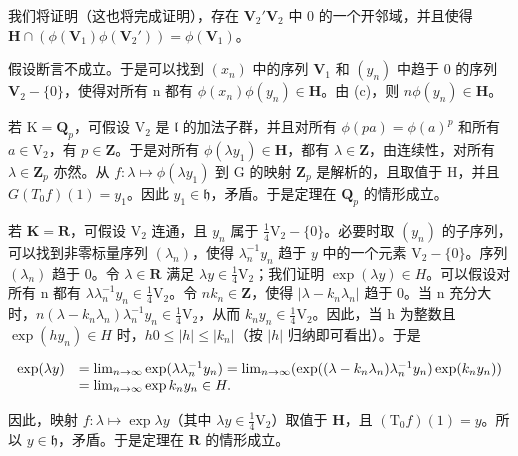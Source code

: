 我们将证明（这也将完成证明），存在 \(\mathbf{V}_2'\)\(\mathbf{V}_2\) 中 0 的一个开邻域，并且使得 \(\mathbf{H} \cap (\phi(\mathbf{V}_1)\phi(\mathbf{V}_2')) = \phi(\mathbf{V}_1)\)。

假设断言不成立。于是可以找到 \((x_{n})\) 中的序列 \(\mathbf{V}_1\) 和 \((y_{n})\) 中趋于 0 的序列 \(\mathbf{V}_2 - \{0\}\)，使得对所有 n 都有 \(\phi (x_n)\phi (y_n)\in \mathbf{H}\)。由 (c)，则 \(n\)\(\phi (y_n)\in \mathbf{H}\)。

若 \(\mathrm{K} = \mathbf{Q}_p\)，可假设 \(\mathrm{V}_2\) 是 \(\mathfrak{l}\) 的加法子群，并且对所有 \(\phi (pa) = \phi (a)^p\) 和所有 \(a\in \mathrm{V}_2\)，有 \(p\in \mathbf{Z}\)。于是对所有 \(\phi (\lambda y_1)\in \mathbf{H}\)，都有 \(\lambda \in \mathbf{Z}\)，由连续性，对所有 \(\lambda \in \mathbf{Z}_p\) 亦然。从 \(f\colon \lambda \mapsto \phi (\lambda y_1)\) 到 G 的映射 \(\mathbf{Z}_p\) 是解析的，且取值于 H，并且 \(G\)\((T_0f)(1) = y_1\)。因此 \(y_{1}\in \mathfrak{h}\)，矛盾。于是定理在 \(\mathbf{Q}_p\) 的情形成立。

若 \(\mathbf{K} = \mathbf{R}\)，可假设 \(\mathrm{V}_2\) 连通，且 \(y_{n}\) 属于 \(\frac{1}{4}\mathrm{V}_2 - \{0\}\)。必要时取 \((y_n)\) 的子序列，可以找到非零标量序列 \((\lambda_n)\)，使得 \(\lambda_n^{-1}y_n\) 趋于 \(y\) 中的一个元素 \(\mathrm{V}_2 - \{0\}\)。序列 \((\lambda_n)\) 趋于 0。令 \(\lambda \in \mathbf{R}\) 满足 \(\lambda y \in \frac{1}{4}\mathrm{V}_2\)；我们证明 \(\exp (\lambda y) \in H\)。可以假设对所有 n 都有 \(\lambda\lambda_n^{-1}y_n \in \frac{1}{4}\mathrm{V}_2\)。令 \(n\)\(k_n \in \mathbf{Z}\)，使得 \(|\lambda - k_n\lambda_n|\) 趋于 0。当 n 充分大时，\(n\)\((\lambda - k_n\lambda_n)\lambda_n^{-1}y_n \in \frac{1}{4}\mathrm{V}_2\)，从而 \(k_n y_n \in \frac{1}{4}\mathrm{V}_2\)。因此，当 h 为整数且 \(\exp (hy_n) \in H\) 时，\(h\)\(0 \leqslant |h| \leqslant |k_n|\)（按 \(|h|\) 归纳即可看出）。于是

\[
\begin{array}{r l} \exp (\lambda y) & = \lim _ {n \to \infty} \exp (\lambda \lambda_ {n} ^ {- 1} y _ {n}) = \lim _ {n \to \infty} (\exp ((\lambda - k _ {n} \lambda_ {n}) \lambda_ {n} ^ {- 1} y _ {n}) \exp (k _ {n} y _ {n})) \\ & = \lim _ {n \to \infty} \exp k _ {n} y _ {n} \in H. \end{array}
\]

因此，映射 \(f \colon \lambda \mapsto \exp \lambda y\)（其中 \(\lambda y \in \frac{1}{4} \mathrm{V}_2\)）取值于 \(\mathbf{H}\)，且 \((\mathrm{T}_0f)(1) = y\)。所以 \(y \in \mathfrak{h}\)，矛盾。于是定理在 \(\mathbf{R}\) 的情形成立。


